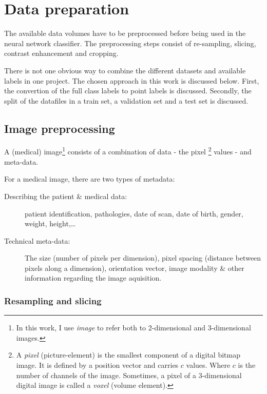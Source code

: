 \chapter{Data preparation}

The available data volumes have to be preprocessed before being used in the neural network classifier.
The preprocessing steps consist of re-sampling, slicing, contrast enhancement and cropping.  

There is not one obvious way to combine the different datasets and available labels in one project.
The chosen approach in this work is discussed below.
First, the convertion of the full class labels to point labels is discussed. 
Secondly, the split of the datafiles in a train set, a validation set and a test set is discussed.

\section{Image preprocessing}

A (medical) image\footnote{In this work, I use \textit{image} to refer both to 2-dimensional and 3-dimensional images.} consists of a combination of data - the pixel
\footnote{A \textit{pixel} (picture-element) is the smallest component of a digital bitmap image. 
It is defined by a position vector and carries $c$ values. Where $c$ is the number of channels of the image. 
Sometimes, a pixel of a 3-dimensional digital image is called a \textit{voxel} (volume element).} 
values - and meta-data.

For a medical image, there are two types of metadata:
\begin{description}
    \item [Describing the patient \& medical data:] patient identification, pathologies, date of scan, date of birth, gender, weight, height,\dots
    \item [Technical meta-data:] The size (number of pixels per dimension), pixel spacing (distance between pixels along a dimension), orientation vector, image modality \& other information regarding the image aquisition.
\end{description}

\subsection{Resampling and slicing\label{sec:resampling}}

